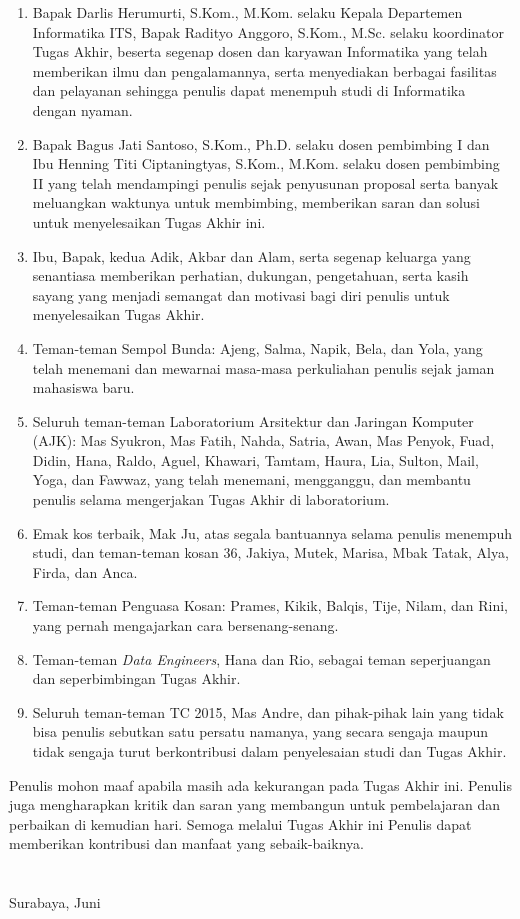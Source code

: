 \begin{enumerate}
	\item Bapak Darlis Herumurti, S.Kom., M.Kom. selaku Kepala Departemen Informatika ITS, Bapak Radityo Anggoro, S.Kom., M.Sc. selaku koordinator Tugas Akhir, beserta segenap dosen dan karyawan Informatika yang telah memberikan ilmu dan pengalamannya, serta menyediakan berbagai fasilitas dan pelayanan sehingga penulis dapat menempuh studi di Informatika dengan nyaman.
	\item Bapak Bagus Jati Santoso, S.Kom., Ph.D. selaku dosen pembimbing I dan Ibu Henning Titi Ciptaningtyas, S.Kom., M.Kom. selaku dosen pembimbing II yang telah mendampingi penulis sejak penyusunan proposal serta banyak meluangkan waktunya untuk membimbing, memberikan saran dan solusi untuk menyelesaikan Tugas Akhir ini.
	\item Ibu, Bapak, kedua Adik, Akbar dan Alam, serta segenap keluarga yang senantiasa memberikan perhatian, dukungan, pengetahuan, serta kasih sayang yang menjadi semangat dan motivasi bagi diri penulis untuk menyelesaikan Tugas Akhir.
	\item Teman-teman Sempol Bunda: Ajeng, Salma, Napik, Bela, dan Yola, yang telah menemani dan mewarnai masa-masa perkuliahan penulis sejak jaman mahasiswa baru.
	\item Seluruh teman-teman Laboratorium Arsitektur dan Jaringan Komputer (AJK): Mas Syukron, Mas Fatih, Nahda, Satria, Awan, Mas Penyok, Fuad, Didin, Hana, Raldo, Aguel, Khawari, Tamtam, Haura, Lia, Sulton, Mail, Yoga, dan Fawwaz, yang telah menemani, mengganggu, dan membantu penulis selama mengerjakan Tugas Akhir di laboratorium. 
	\item Emak kos terbaik, Mak Ju, atas segala bantuannya selama penulis menempuh studi, dan teman-teman kosan 36, Jakiya, Mutek, Marisa, Mbak Tatak, Alya, Firda, dan Anca.
	\item Teman-teman Penguasa Kosan: Prames, Kikik, Balqis, Tije, Nilam, dan Rini, yang pernah mengajarkan cara bersenang-senang.
	\item Teman-teman \textit{Data Engineers}, Hana dan Rio, sebagai teman seperjuangan dan seperbimbingan Tugas Akhir.
	\item Seluruh teman-teman TC 2015, Mas Andre, dan pihak-pihak lain yang tidak bisa penulis sebutkan satu persatu namanya, yang secara sengaja maupun tidak sengaja turut berkontribusi dalam penyelesaian studi dan Tugas Akhir.
\end{enumerate}

\pagebreak
Penulis mohon maaf apabila masih ada kekurangan pada Tugas Akhir ini. Penulis juga mengharapkan kritik dan saran yang membangun untuk pembelajaran dan perbaikan di kemudian hari. Semoga melalui Tugas Akhir ini Penulis dapat memberikan kontribusi dan manfaat yang sebaik-baiknya. \\ \\ \\

\hfill Surabaya, Juni \tahun \\ \\ \\

\hfill \penulis \\
\cleardoublepage
